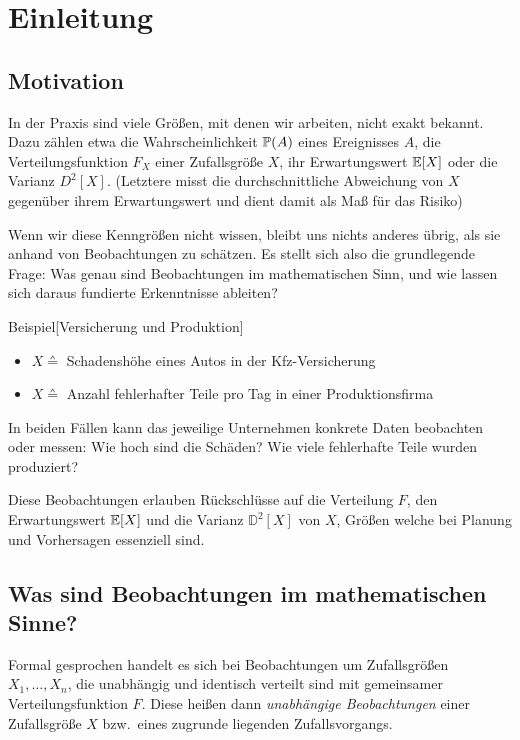 
\newpage
\section{Einleitung}

\subsection*{Motivation}

In der Praxis sind viele Größen, mit denen wir arbeiten, nicht exakt bekannt. 
Dazu zählen etwa die Wahrscheinlichkeit $\P(A)$ eines Ereignisses $A$, die Verteilungsfunktion $F_X$ einer 
Zufallsgröße $X$, ihr Erwartungswert $\E[X]$ oder die Varianz $D^2[X]$. (Letztere misst die durchschnittliche Abweichung 
von $X$ gegenüber ihrem Erwartungswert und dient damit als Maß für das Risiko)

Wenn wir diese Kenngrößen nicht wissen, bleibt uns nichts anderes übrig, als sie anhand von Beobachtungen zu schätzen. 
Es stellt sich also die grundlegende Frage: Was genau sind Beobachtungen im mathematischen Sinn, 
und wie lassen sich daraus fundierte Erkenntnisse ableiten?

\begin{colbox}{Beispiel}[Versicherung und Produktion]
\begin{itemize}
    \item $X \wedgeq$ Schadenshöhe eines Autos in der Kfz-Versicherung
    \item $X \wedgeq $ Anzahl fehlerhafter Teile pro Tag in einer Produktionsfirma
\end{itemize}
In beiden Fällen kann das jeweilige Unternehmen konkrete Daten beobachten oder messen: Wie hoch sind die Schäden? 
Wie viele fehlerhafte Teile wurden produziert?

Diese Beobachtungen erlauben Rückschlüsse auf die Verteilung $F$, den Erwartungswert $\E[X]$ 
und die Varianz $\mathbb{D}^2[X]$ von $X$, Größen welche bei Planung und Vorhersagen essenziell sind.
\end{colbox}

\subsection*{Was sind Beobachtungen im mathematischen Sinne?}

Formal gesprochen handelt es sich bei Beobachtungen um Zufallsgrößen $X_1, \dots, X_n$, die unabhängig und identisch 
verteilt sind mit gemeinsamer Verteilungsfunktion $F$. 
Diese heißen dann \emph{unabhängige Beobachtungen} einer Zufallsgröße $X$ bzw.\ eines zugrunde 
liegenden Zufallsvorgangs.

